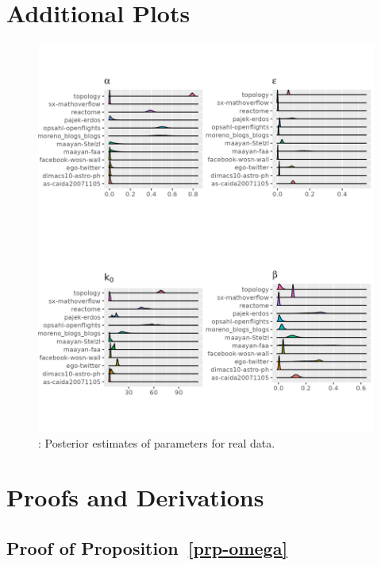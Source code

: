 \documentclass[
  sn-basic,
]{sn-jnl}
\theoremstyle{plain}
\theoremstyle{plain}
\theoremstyle{remark}
\begin{document}
\setcounter{section}{0}
\renewcommand{\thesection}{\Alph{section}}
\setcounter{table}{0}
\renewcommand{\thetable}{A\arabic{table}}
\setcounter{figure}{0}
\renewcommand{\thefigure}{A\arabic{figure}}

\newpage

\section{Additional Plots}\label{additional-plots}

\begin{figure}[H]

{\centering \includegraphics[width=0.8\linewidth,height=\textheight,keepaspectratio]{images/pars_plot.png}

}

\caption{: Posterior estimates of parameters for real data.}

\end{figure}%

\section{Proofs and Derivations}\label{sec-proofs}

\subsection{\texorpdfstring{Proof of
Proposition~\ref{prp-omega}}{Proof of Proposition~}}\label{proof-of-prp-omega}
\end{document}
